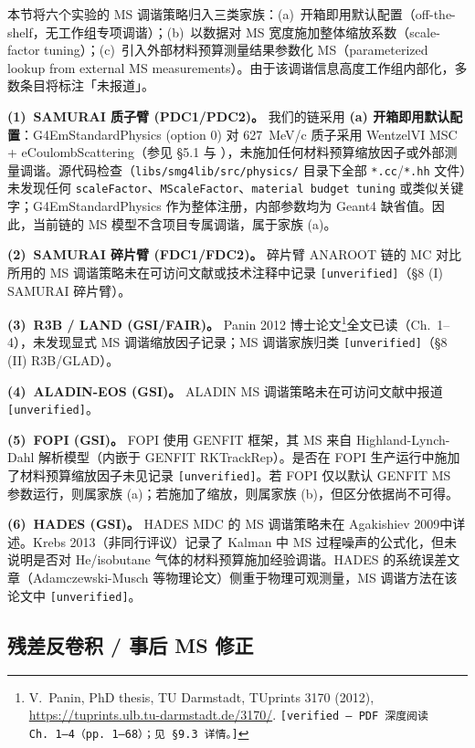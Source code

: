 \documentclass[a4paper, 11pt]{article}
\begin{document}
本节将六个实验的 MS 调谐策略归入三类家族：(a)~开箱即用默认配置（off-the-shelf，无工作组专项调谐）；(b)~以数据对 MS 宽度施加整体缩放系数（scale-factor tuning）；(c)~引入外部材料预算测量结果参数化 MS（parameterized lookup from external MS measurements）。由于该调谐信息高度工作组内部化，多数条目将标注「未报道」。

\textbf{(1)~SAMURAI 质子臂 (PDC1/PDC2)。}
我们的链采用 \textbf{(a) 开箱即用默认配置}：G4EmStandardPhysics (option 0) 对 627~MeV/c 质子采用 WentzelVI MSC + eCoulombScattering（参见 §5.1 与 ），未施加任何材料预算缩放因子或外部测量调谐。源代码检查（\texttt{libs/smg4lib/src/physics/} 目录下全部 \texttt{*.cc}/\texttt{*.hh} 文件）未发现任何 \texttt{scaleFactor}、\texttt{MScaleFactor}、\texttt{material budget tuning} 或类似关键字；G4EmStandardPhysics 作为整体注册，内部参数均为 Geant4 缺省值。因此，当前链的 MS 模型不含项目专属调谐，属于家族 (a)。

\textbf{(2)~SAMURAI 碎片臂 (FDC1/FDC2)。}
碎片臂 ANAROOT 链的 MC 对比所用的 MS 调谐策略未在可访问文献或技术注释中记录 \texttt{[unverified]}（§8 (I) SAMURAI 碎片臂）。

\textbf{(3)~R3B / LAND (GSI/FAIR)。}
Panin 2012 博士论文\footnote{\label{fn:panin2012thesis}V.~Panin, PhD thesis, TU Darmstadt, TUprints 3170 (2012), \url{https://tuprints.ulb.tu-darmstadt.de/3170/}. \texttt{[verified --- PDF 深度阅读 Ch.~1--4（pp.~1--68）；见 §9.3 详情。]}}全文已读（Ch.~1--4），未发现显式 MS 调谐缩放因子记录；MS 调谐家族归类 \texttt{[unverified]}（§8 (II) R3B/GLAD）。

\textbf{(4)~ALADIN-EOS (GSI)。}
ALADIN MS 调谐策略未在可访问文献中报道 \texttt{[unverified]}。

\textbf{(5)~FOPI (GSI)。}
FOPI 使用 GENFIT 框架，其 MS 来自 Highland-Lynch-Dahl 解析模型（内嵌于 GENFIT RKTrackRep）。是否在 FOPI 生产运行中施加了材料预算缩放因子未见记录 \texttt{[unverified]}。若 FOPI 仅以默认 GENFIT MS 参数运行，则属家族 (a)；若施加了缩放，则属家族 (b)，但区分依据尚不可得。

\textbf{(6)~HADES (GSI)。}
HADES MDC 的 MS 调谐策略未在 Agakishiev 2009中详述。Krebs 2013（非同行评议）记录了 Kalman 中 MS 过程噪声的公式化，但未说明是否对 He/isobutane 气体的材料预算施加经验调谐。HADES 的系统误差文章（Adamczewski-Musch 等物理论文）侧重于物理可观测量，MS 调谐方法在该论文中 \texttt{[unverified]}。

\subsection{残差反卷积 / 事后 MS 修正}
\label{sec:ms_deconvolution}
\end{document}
